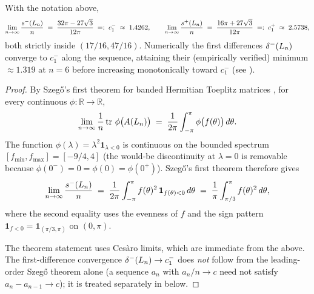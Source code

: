\begin{theorem}\label{thm:2path-szego}
With the notation above,
\[
\lim_{n \to \infty} \frac{s^{-}(L_{n})}{n}
\;=\; \frac{32 \pi - 27 \sqrt{3}}{12 \pi}
\;=:\; c_{1}^{-}
\;\approx\; 1.4262,
\qquad
\lim_{n \to \infty} \frac{s^{+}(L_{n})}{n}
\;=\; \frac{16 \pi + 27 \sqrt{3}}{12 \pi}
\;=:\; c_{1}^{+}
\;\approx\; 2.5738,
\]
both strictly inside $(17/16, 47/16)$. Numerically the
first differences $\delta^{-}(L_{n})$ converge to $c_{1}^{-}$ along the
sequence, attaining their (empirically verified) minimum $\approx 1.319$
at $n = 6$ before increasing monotonically toward $c_{1}^{-}$ (see
).
\end{theorem}

\begin{proof}
By Szeg\H{o}'s first theorem for banded Hermitian Toeplitz matrices
\cite{GrenanderSzego1958, BottcherSilbermann}, for every continuous
$\phi : \mathbb{R} \to \mathbb{R}$,
\[
\lim_{n \to \infty} \frac{1}{n} \operatorname{tr}\,\phi\bigl(A(L_{n})\bigr)
\;=\; \frac{1}{2\pi}\int_{-\pi}^{\pi} \phi\bigl(f(\theta)\bigr)\, d\theta.
\]
The function $\phi(\lambda) = \lambda^{2} \mathbf{1}_{\lambda < 0}$ is
continuous on the bounded spectrum $[f_{\min}, f_{\max}] = [-9/4, 4]$
(the would-be discontinuity at $\lambda = 0$ is removable because
$\phi(0^{-}) = 0 = \phi(0) = \phi(0^{+})$). Szeg\H{o}'s first theorem
therefore gives
\[
\lim_{n \to \infty} \frac{s^{-}(L_{n})}{n}
\;=\; \frac{1}{2\pi} \int_{-\pi}^{\pi} f(\theta)^{2}\,
\mathbf{1}_{f(\theta) < 0}\, d\theta
\;=\; \frac{1}{\pi} \int_{\pi/3}^{\pi} f(\theta)^{2}\, d\theta,
\]
where the second equality uses the evenness of $f$ and the sign
pattern $\mathbf{1}_{f < 0} = \mathbf{1}_{(\pi/3, \pi)}$ on $(0, \pi)$.

The theorem statement uses Ces\`aro limits, which are immediate from
the above. The first-difference convergence
$\delta^{-}(L_{n}) \to c_{1}^{-}$ does \emph{not} follow from the
leading-order Szeg\H{o} theorem alone (a sequence $a_{n}$ with
$a_{n}/n \to c$ need not satisfy $a_{n} - a_{n-1} \to c$); it is
treated separately in  below.


\end{proof}
